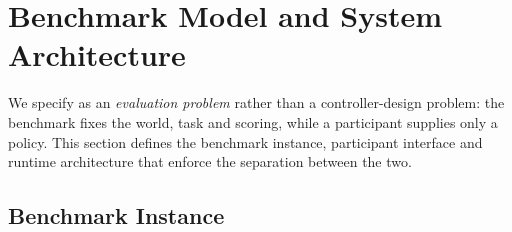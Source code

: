 \section{Benchmark Model and System Architecture}
\label{sec:system_overview}

We specify \mra{} as an \emph{evaluation problem} rather than a controller-design problem: the benchmark fixes the world, task and scoring, while a participant supplies only a policy. This section defines the benchmark instance, participant interface and runtime architecture that enforce the separation between the two.

\subsection{Benchmark Instance}

